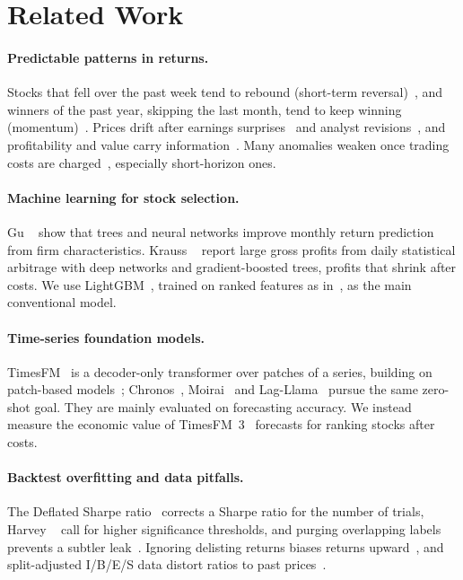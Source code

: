 \section{Related Work}
\label{sec:related}

\paragraph{Predictable patterns in returns.}
Stocks that fell over the past week tend to rebound (short-term reversal)~\cite{jegadeesh1990evidence,lehmann1990fads}, and winners of the past year, skipping the last month, tend to keep winning (momentum)~\cite{jegadeesh1993returns,carhart1997persistence}.
Prices drift after earnings surprises~\cite{bernard1989post,livnat2006comparing} and analyst revisions~\cite{chan1996momentum}, and profitability and value carry information~\cite{novymarx2013other,fama2015five}.
Many anomalies weaken once trading costs are charged~\cite{novymarx2016taxonomy}, especially short-horizon ones.

\paragraph{Machine learning for stock selection.}
Gu \etal~\cite{gu2020empirical} show that trees and neural networks improve monthly return prediction from firm characteristics.
Krauss \etal~\cite{krauss2017deep} report large gross profits from daily statistical arbitrage with deep networks and gradient-boosted trees, profits that shrink after costs.
We use LightGBM~\cite{ke2017lightgbm}, trained on ranked features as in~\cite{gu2020empirical}, as the main conventional model.

\paragraph{Time-series foundation models.}
TimesFM~\cite{das2024timesfm} is a decoder-only transformer over patches of a series, building on patch-based models~\cite{nie2023patchtst}; Chronos~\cite{ansari2024chronos}, Moirai~\cite{woo2024moirai} and Lag-Llama~\cite{rasul2023lagllama} pursue the same zero-shot goal.
They are mainly evaluated on forecasting accuracy.
We instead measure the economic value of TimesFM~3~\cite{timesfm3} forecasts for ranking stocks after costs.

\paragraph{Backtest overfitting and data pitfalls.}
The Deflated Sharpe ratio~\cite{bailey2014deflated} corrects a Sharpe ratio for the number of trials, Harvey \etal~\cite{harvey2016cross} call for higher significance thresholds, and purging overlapping labels prevents a subtler leak~\cite{lopezdeprado2018advances}.
Ignoring delisting returns biases returns upward~\cite{shumway1997delisting}, and split-adjusted I/B/E/S data distort ratios to past prices~\cite{payne2003ibes}.
